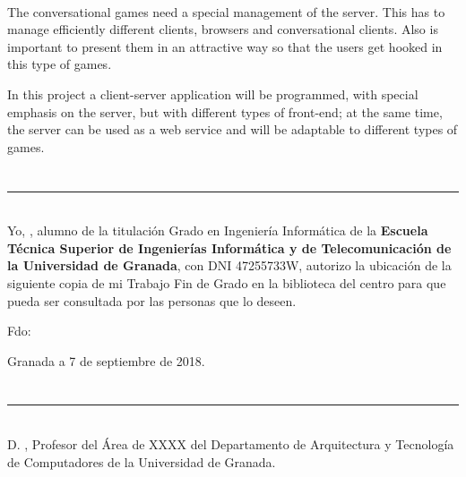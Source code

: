 \vspace{0.7cm}
\\

The conversational games need a special management of the server. This has to  manage  efficiently different clients, browsers and conversational clients. Also is important to present them in an attractive way so that the users get hooked in this type of games.

In this project a client-server application will be programmed, with special emphasis on the server, but with different types of front-end; at the same time, the server can be used as a web service and will be adaptable to different types of games.
\chapter*{}
\thispagestyle{empty}

\noindent\rule[-1ex]{\textwidth}{2pt}\\[4.5ex]

Yo, \textbf{\myName}, alumno de la titulación Grado en Ingeniería Informática de la \textbf{Escuela Técnica Superior
de Ingenierías Informática y de Telecomunicación de la Universidad de Granada}, con DNI 47255733W, autorizo la
ubicación de la siguiente copia de mi Trabajo Fin de Grado en la biblioteca del centro para que pueda ser
consultada por las personas que lo deseen.

\vspace{6cm}

\noindent Fdo: \myName

\vspace{2cm}

\begin{flushright}
Granada a 7 de septiembre de 2018.
\end{flushright}


\chapter*{}
\thispagestyle{empty}

\noindent\rule[-1ex]{\textwidth}{2pt}\\[4.5ex]

D. \textbf{\myProf}, Profesor del Área de XXXX del Departamento de Arquitectura y Tecnología de Computadores de la Universidad de Granada.

\vspace{0.5cm}


\vspace{0.5cm}

